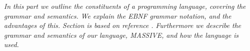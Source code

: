 \textit{In this part we outline the constituents of a programming language, covering the grammar and semantics. We explain the EBNF grammar notation, and the advantages of this. Section \label{sec:ebnf} is based on reference \cite{misc:spo}. Furthermore we describe the grammar and semantics of our language, MASSIVE, and how the language is used.}\\ \\